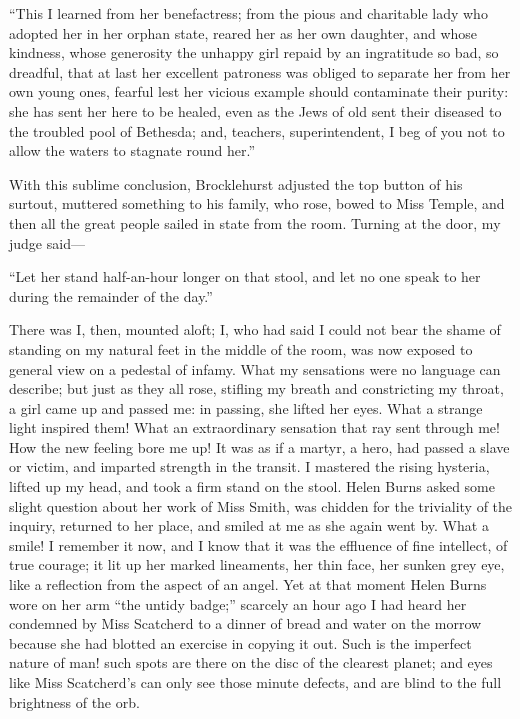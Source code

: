 \enquote{This I learned from her benefactress; from the pious and
	charitable lady who adopted her in her orphan state, reared her as her
	own daughter, and whose kindness, whose generosity the unhappy girl
	repaid by an ingratitude so bad, so dreadful, that at last her excellent
	patroness was obliged to separate her from her own young ones, fearful
	lest her vicious example should contaminate their purity: she has sent
	her here to be healed, even as the Jews of old sent their diseased to
	the troubled pool of Bethesda; and, teachers, superintendent, I beg of
	you not to allow the waters to stagnate round her.}

With this sublime conclusion, \Mr{} Brocklehurst adjusted the top button
of his surtout, muttered something to his family, who rose, bowed to
Miss Temple, and then all the great people sailed in state from the
room. Turning at the door, my judge said---

\enquote{Let her stand half-an-hour longer on that stool, and let no one
	speak to her during the remainder of the day.}

There was I, then, mounted aloft; I, who had said I could not bear the
shame of standing on my natural feet in the middle of the room, was now
exposed to general view on a pedestal of infamy. What my sensations
were no language can describe; but just as they all rose, stifling my
breath and constricting my throat, a girl came up and passed me: in
passing, she lifted her eyes. What a strange light inspired them! What
an extraordinary sensation that ray sent through me! How the new
feeling bore me up! It was as if a martyr, a hero, had passed a slave
or victim, and imparted strength in the transit. I mastered the rising
hysteria, lifted up my head, and took a firm stand on the stool. Helen
Burns asked some slight question about her work of Miss Smith, was
chidden for the triviality of the inquiry, returned to her place, and
smiled at me as she again went by. What a smile! I remember it now,
and I know that it was the effluence of fine intellect, of true courage;
it lit up her marked lineaments, her thin face, her sunken grey eye,
like a reflection from the aspect of an angel. Yet at that moment Helen
Burns wore on her arm \enquote{the untidy badge;} scarcely an hour ago I
had heard her condemned by Miss Scatcherd to a dinner of bread and water
on the morrow because she had blotted an exercise in copying it out.
Such is the imperfect nature of man! such spots are there on the disc of
the clearest planet; and eyes like Miss Scatcherd's can only see those
minute defects, and are blind to the full brightness of the orb.
